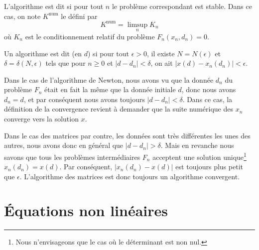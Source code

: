 L'algorithme est dit  si pour tout \( n\) le problème correspondant est stable.  Dans ce cas, on note \( K^{\mbox{num}}\) le   défini par
\begin{equation}
	K^{\mbox{num}}=\limsup_nK_n
\end{equation}
où \( K_n\) est le conditionnement relatif du problème \( F_n(x_n,d_n)=0\).

\begin{definition}      \label{DefAlgoConverge}
	Un algorithme est dit  (en \( d\)) si pour tout \( \epsilon>0\), il existe \( N=N(\epsilon)\) et \( \delta=\delta(N,\epsilon)\) tels que pour \( n\geq0\) et \( |d-d_n|<\delta\), on ait \( |x(d)-x_n(d_n)|<\epsilon\).
\end{definition}

\begin{remark}      \label{RemConvAlgoNewton}
	Dans le cas de l'algorithme de Newton, nous avons vu que la donnée \( d_n\) du problème \( F_n\) était en fait la même que la donnée initiale \( d\), donc nous avons \( d_n=d\), et par conséquent nous avons toujours \( | d-d_n |<\delta\). Dans ce cas, la définition de la convergence revient à demander que la suite numérique des \( x_n\) converge vers la solution \( x\).
\end{remark}

\begin{remark}
	Dans le cas des matrices par contre, les données sont très différentes les unes des autres, nous avons donc en général que \( | d-d_n |>\delta\). Mais en revanche nous savons que tous les problèmes intermédiaires \( F_n\) acceptent une solution unique\footnote{Nous n'envisageons que le cas où le déterminant est non nul.} \( x_n(d_n)=x(d)\). Par conséquent, \( | x_n(d_n)-x(d) |\) est toujours plus petit que \( \epsilon\). L'algorithme des matrices est donc toujours un algorithme convergent.
\end{remark}

\section{Équations non linéaires}

